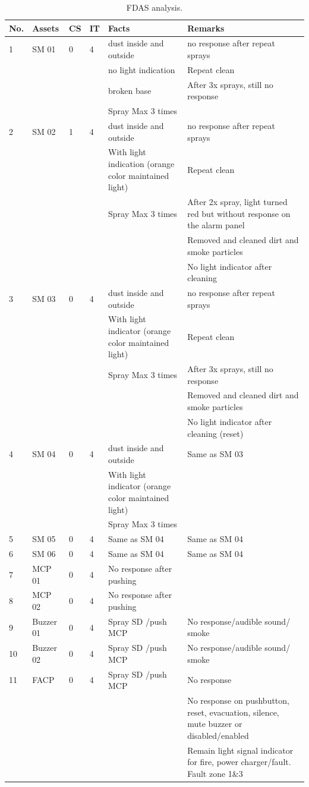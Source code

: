 \begin{table}[!h]
	\caption{FDAS analysis.}
	\label{ch05_tbl_fdas01}
	{\footnotesize
\begin{tabular}{l|l|l|l|p{5cm}|p{5cm}}
	\hline
	No. & Assets & CS & IT & Facts & Remarks \\ 
	\hline
	1 & SM 01 & 0 & 4 & dust inside and outside & no response after repeat sprays \\ 
	&  &  &  & no light indication & Repeat clean \\ 
	&  &  &  & broken base & After 3x sprays, still no response \\ 
	&  &  &  & Spray Max 3 times &  \\ 
	\hline
	2 & SM 02 & 1 & 4 & dust inside and outside & no response after repeat sprays \\ 
	&  &  &  & With light indication (orange color maintained light) & Repeat clean \\ 
	&  &  &  & Spray Max 3 times & After 2x spray, light turned red but without response on the alarm panel \\ 
	&  &  &  &  & Removed and cleaned dirt and smoke particles \\ 
	&  &  &  &  & No light indicator after cleaning \\ 
	\hline
	3 & SM 03 & 0 & 4 & dust inside and outside & no response after repeat sprays \\ 
	&  &  &  & With light indicator (orange color maintained light) & Repeat clean \\ 
	&  &  &  & Spray Max 3 times & After 3x sprays, still no response \\ 
	&  &  &  &  & Removed and cleaned dirt and smoke particles \\ 
	&  &  &  &  & No light indicator after cleaning (reset) \\ 
	\hline
	4 & SM 04 & 0 & 4 & dust inside and outside & Same as SM 03 \\ 
	&  &  &  & With light indicator (orange color maintained light) &  \\ 
	&  &  &  & Spray Max 3 times &  \\ 
	\hline
	5 & SM 05 & 0 & 4 & Same as SM 04 & Same as SM 04 \\ 
	\hline
	6 & SM 06 & 0 & 4 & Same as SM 04 & Same as SM 04 \\ 
	\hline
	7 & MCP 01 & 0 & 4 & No response after pushing &  \\ 
	\hline
	8 & MCP 02 & 0 & 4 & No response after pushing &  \\ 
	\hline
	9 & Buzzer 01 & 0 & 4 & Spray SD /push MCP & No response/audible sound/ smoke  \\ 
	\hline
	10 & Buzzer 02 & 0 & 4 & Spray SD /push MCP & No response/audible sound/ smoke  \\ 
	\hline
	11 & FACP & 0 & 4 & Spray SD /push MCP & No response \\ 
	&  &  &  &  & No response on pushbutton, reset, evacuation, silence, mute buzzer or disabled/enabled \\ 
	&  &  &  &  & Remain light signal indicator for fire, power charger/fault. Fault zone 1\&3 \\ 
	\hline
\end{tabular}
	
}
\end{table}
